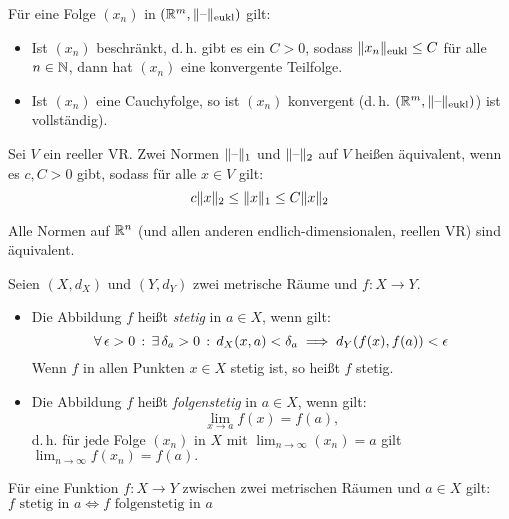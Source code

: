 \documentclass{cheat-sheet}
\begin{document}

\begin{satz}
Für eine Folge $(x_n)$ in $(\mathbb{R}^m, \lVert\text{--}\rVert_{\text{eukl}})$ gilt:

\begin{itemize}
  \item Ist $(x_n)$ beschränkt, d.\,h. gibt es ein $C > 0$, sodass $\lVert x_n\rVert_{\text{eukl}} \le C$ für alle $n \in \mathbb{N}$, dann hat $(x_n)$ eine konvergente Teilfolge.
  \item Ist $(x_n)$ eine Cauchyfolge, so ist $(x_n)$ konvergent (d.\,h. $(\mathbb{R}^m, \lVert\text{--}\rVert_{\text{eukl}})$) ist vollständig).
\end{itemize}
\end{satz}

\begin{defn}
Sei $V$ ein reeller VR. Zwei Normen $\lVert\text{--}\rVert_1$ und $\lVert\text{--}\rVert_2$ auf $V$ heißen äquivalent, wenn es $c, C > 0$ gibt, sodass für alle $x \in V$ gilt:
\[ c \lVert x\rVert_2 \le \lVert x\rVert_1 \le C \lVert x\rVert_2 \]
\end{defn}


\begin{satz}
Alle Normen auf $\mathbb{R}^n$ (und allen anderen endlich-dimensionalen, reellen VR) sind äquivalent.
\end{satz}

\begin{defn}
Seien $(X, d_X)$ und $(Y, d_Y)$ zwei metrische Räume und $f : X \to Y$.
\begin{itemize}
  \item Die Abbildung $f$ heißt \emph{stetig} in $a \in X$, wenn gilt:
  \[ \forall \, {\epsilon > 0} \,:\, \exists \, {\delta_a > 0} \,:\, d_X(x, a) < \delta_a \implies d_Y(f(x), f(a)) < \epsilon \]
  Wenn $f$ in allen Punkten $x \in X$ stetig ist, so heißt $f$ stetig.
  \item Die Abbildung $f$ heißt \emph{folgenstetig} in $a \in X$, wenn gilt:
  \[ \lim_{x \to a} f(x) = f(a), \]
  d.\,h. für jede Folge $(x_n)$ in $X$ mit $\lim_{n \to \infty} (x_n) = a$ gilt $\lim_{n \to \infty} f(x_n) = f(a).$
\end{itemize}
\end{defn}

\begin{satz}
Für eine Funktion $f : X \to Y$ zwischen zwei metrischen Räumen und $a \in X$ gilt:
$f \text{ stetig in } a \iff f \text{ folgenstetig in } a$
\end{satz}
\end{document}

